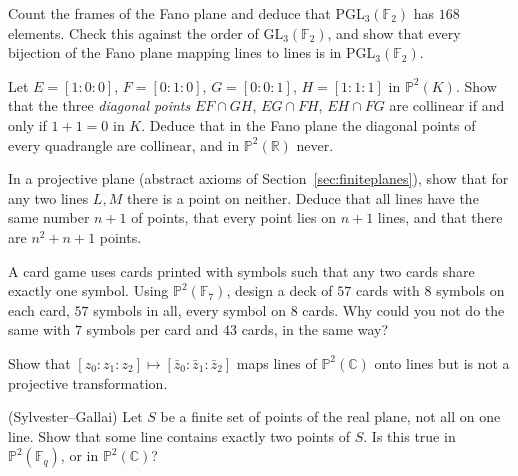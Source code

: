 \begin{exercise}[$\star\star$]\label{ex:fano168}
Count the frames of the Fano plane and deduce that $\mathrm{PGL}_3(\mathbb F_2)$ has $168$ elements. Check this against the order of
$\mathrm{GL}_3(\mathbb F_2)$, and show that every bijection of the Fano plane mapping lines to lines is in $\mathrm{PGL}_3(\mathbb F_2)$.
\end{exercise}

\begin{exercise}[$\star$]\label{ex:fanodiag}
Let $E=[1:0:0]$, $F=[0:1:0]$, $G=[0:0:1]$, $H=[1:1:1]$ in $\mathbb P^2(K)$. Show that the three \emph{diagonal points} $EF\cap GH$,
$EG\cap FH$, $EH\cap FG$ are collinear if and only if $1+1=0$ in $K$. Deduce that in the Fano plane the diagonal points of every quadrangle
are collinear, and in $\mathbb P^2(\mathbb R)$ never.
\end{exercise}

\begin{exercise}[$\star\star$]\label{ex:planeorder}
In a projective plane (abstract axioms of Section~\ref{sec:finiteplanes}), show that for any two lines $L,M$ there is a point on neither. Deduce
that all lines have the same number $n+1$ of points, that every point lies on $n+1$ lines, and that there are $n^2+n+1$ points.
\end{exercise}

\begin{exercise}[$\star\star$]\label{ex:dobble}
A card game uses cards printed with symbols such that any two cards share exactly one symbol. Using $\mathbb P^2(\mathbb F_7)$, design a
deck of $57$ cards with $8$ symbols on each card, $57$ symbols in all, every symbol on $8$ cards. Why could you not do the same with $7$
symbols per card and $43$ cards, in the same way?
\end{exercise}

\begin{exercise}[$\star\star$]\label{ex:complexcollineation}
Show that $[z_0:z_1:z_2]\mapsto[\bar z_0:\bar z_1:\bar z_2]$ maps lines of $\mathbb P^2(\mathbb C)$ onto lines but is not a projective
transformation.
\end{exercise}

\begin{exercise}[$\star\star\star$]\label{ex:sylvestergallai}
(Sylvester--Gallai) Let $S$ be a finite set of points of the real plane, not all on one line. Show that some line contains exactly two points of
$S$. Is this true in $\mathbb P^2(\mathbb F_q)$, or in $\mathbb P^2(\mathbb C)$?
\end{exercise}

